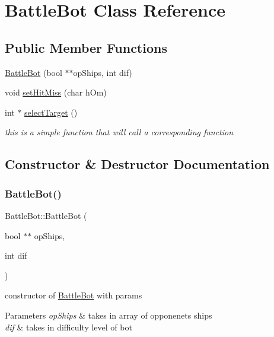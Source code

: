 \hypertarget{classBattleBot}{}\section{Battle\+Bot Class Reference}
\label{classBattleBot}
\subsection*{Public Member Functions}
\begin{DoxyCompactItemize}
\item 
\hyperlink{classBattleBot_ab524730893ce43d9b5ae5d8f678f8684}{Battle\+Bot} (bool $\ast$$\ast$op\+Ships, int dif)
\item 
void \hyperlink{classBattleBot_ae604c63e69028ae8c7e26008d3c7d6fc}{set\+Hit\+Miss} (char h\+Om)
\item 
\mbox{\label{classBattleBot_ab16238e38b9f2b49de0d6d603da107cb}} 
int $\ast$ \hyperlink{classBattleBot_ab16238e38b9f2b49de0d6d603da107cb}{select\+Target} ()
\begin{DoxyCompactList}\small\item\em this is a simple function that will call a corresponding function \end{DoxyCompactList}\end{DoxyCompactItemize}


\subsection{Constructor \& Destructor Documentation}
\mbox{\label{classBattleBot_ab524730893ce43d9b5ae5d8f678f8684}} 
\subsubsection{\texorpdfstring{Battle\+Bot()}{BattleBot()}}
{\footnotesize\ttfamily Battle\+Bot\+::\+Battle\+Bot (\begin{DoxyParamCaption}\item[{bool $\ast$$\ast$}]{op\+Ships,  }\item[{int}]{dif }\end{DoxyParamCaption})}

constructor of \hyperlink{classBattleBot}{Battle\+Bot} with params 
\begin{DoxyParams}{Parameters}
{\em op\+Ships} & takes in array of opponenets ships \\
\hline
{\em dif} & takes in difficulty level of bot \\
\hline
\end{DoxyParams}


